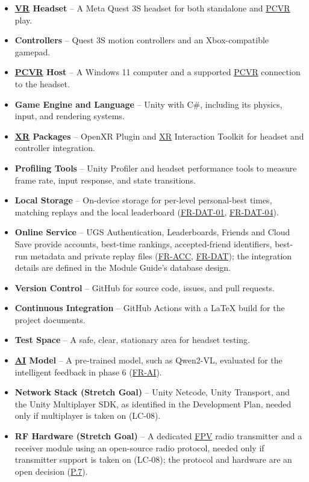 \documentclass[12pt]{article}
\begin{document}
\begin{itemize}
\item \textbf{\hyperlink{glos:VR}{VR} Headset} -- A Meta Quest 3S headset for both standalone and
\hyperlink{glos:PCVR}{PCVR} play.
\item \textbf{Controllers} -- Quest 3S motion controllers and an
Xbox-compatible gamepad.
\item \textbf{\hyperlink{glos:PCVR}{PCVR} Host} -- A Windows 11 computer and a supported \hyperlink{glos:PCVR}{PCVR}
connection to the headset.
\item \textbf{Game Engine and Language} -- Unity with C\#, including its
physics, input, and rendering systems.
\item \textbf{\hyperlink{glos:XR}{XR} Packages} -- OpenXR Plugin and \hyperlink{glos:XR}{XR} Interaction Toolkit for
headset and controller integration.
\item \textbf{Profiling Tools} -- Unity Profiler and headset performance
tools to measure frame rate, input response, and state transitions.
\item \textbf{Local Storage} -- On-device storage for per-level personal-best
times, matching replays and the
local leaderboard (\hyperlink{req:FR-DAT-01}{FR-DAT-01},
\hyperlink{req:FR-DAT-04}{FR-DAT-04}).
\item \textbf{Online Service} -- UGS Authentication, Leaderboards, Friends and
Cloud Save provide accounts, best-time rankings, accepted-friend identifiers,
best-run metadata and private replay files
(\hyperref[sec:s2-accounts]{FR-ACC}, \hyperref[sec:s2-leaderboard]{FR-DAT});
the integration details are defined in the Module Guide's database design.
\item \textbf{Version Control} -- GitHub for source code, issues, and pull
requests.
\item \textbf{Continuous Integration} -- GitHub Actions with a \LaTeX{}
build for the project documents.
\item \textbf{Test Space} -- A safe, clear, stationary area for headset
testing.
\item \textbf{\hyperlink{glos:AI}{AI} Model} -- A pre-trained model, such as Qwen2-VL, evaluated
for the intelligent feedback in phase 6 (\hyperref[sec:s2-ai]{FR-AI}).
\item \textbf{Network Stack (Stretch Goal)} -- Unity Netcode, Unity Transport,
and the Unity Multiplayer SDK, as identified in the Development Plan, needed
only if multiplayer is taken on (LC-08).
\item \textbf{RF Hardware (Stretch Goal)} -- A dedicated \hyperlink{glos:FPV}{FPV} radio transmitter
and a receiver module using an open-source radio protocol, needed only if
transmitter support is taken on (LC-08); the protocol and hardware are an
open decision (\hyperref[p7]{P.7}).
\end{itemize}
\end{document}
